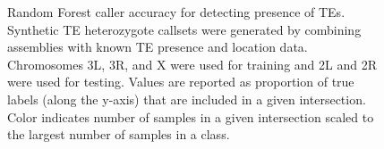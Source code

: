 \begin{figure}
    \centering
    \caption[Random Forest caller accuracy for detecting presence of TEs.]{Random Forest caller accuracy for detecting presence of TEs. Synthetic TE heterozygote callsets were generated by combining assemblies with known TE presence and location data. Chromosomes 3L, 3R, and X were used for training and 2L and 2R were used for testing.  Values are reported as proportion of true labels (along the y-axis) that are included in a given intersection. Color indicates number of samples in a given intersection scaled to the largest number of samples in a class.}
    \label{fig:terfconfmat}
\end{figure}


